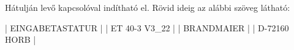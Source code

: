 \documentclass{article}
\begin{document}
Hátulján levő kapcsolóval indítható el. Rövid ideig az alábbi szöveg látható:

|  EINGABETASTATUR   |
|  ET 40-3  V3_22    |
|    BRANDMAIER      |
|   D-72160 HORB     |
\end{document}
